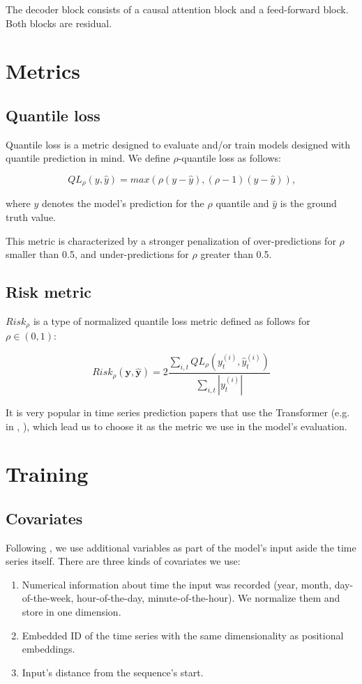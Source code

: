 \documentclass[en]{pracamgr}
\begin{document}
The decoder block consists of a causal attention block and a feed-forward block. Both blocks are residual.

\section{Metrics}

\subsection{Quantile loss}

Quantile loss is a metric designed to evaluate and/or train models designed with quantile prediction in mind.
We define $\rho$-quantile loss as follows:

$$ QL_\rho(y, \hat{y}) = max(\rho(y - \hat{y}), (\rho - 1)(y - \hat{y})) \text{,} $$

where $y$ denotes the model's prediction for the $\rho$ quantile and $\hat{y}$ is the ground truth value.

This metric is characterized by a stronger penalization of over-predictions for $\rho$ smaller than 0.5, and under-predictions for $\rho$ greater than 0.5.

\subsection{Risk metric}

$Risk_\rho$ is a type of normalized quantile loss metric defined as follows for $\rho \in (0,1)$:

$$ Risk_\rho(\textbf{y}, \hat{\textbf{y}}) 
= 2\frac{\sum_{i,t}QL_\rho(y^{(i)}_t,\hat{y}^{(i)}_t)}
{\sum_{i,t} |y^{(i)}_t|}$$


It is very popular in time series prediction papers that use the Transformer (e.g. in \cite{enhancing}, \cite{deepar}), which lead us to choose it as the metric we use in the model's evaluation.

\section{Training}

\subsection{Covariates}

Following \cite{enhancing}, we use additional variables as part of the model's input aside the time series itself.
There are three kinds of covariates we use:
\begin{enumerate}
	\item Numerical information about time the input was recorded (year, month, day-of-the-week, hour-of-the-day, minute-of-the-hour). We normalize them and store in one dimension.
	\item Embedded ID of the time series with the same dimensionality as positional embeddings.
	\item Input's distance from the sequence's start.
\end{enumerate}
\end{document}
